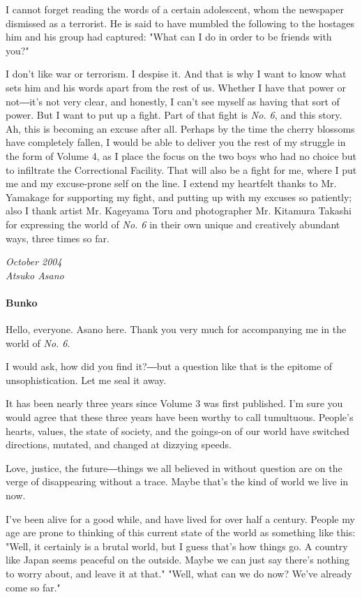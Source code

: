 I cannot forget reading the words of a certain adolescent, whom the
newspaper dismissed as a terrorist. He is said to have mumbled the
following to the hostages him and his group had captured: "What can I do
in order to be friends with you?"

I don't like war or terrorism. I despise it. And that is why I want to
know what sets him and his words apart from the rest of us. Whether I
have that power or not―it's not very clear, and honestly, I can't see
myself as having that sort of power. But I want to put up a fight. Part
of that fight is \emph{No. 6}, and this story. Ah, this is becoming an excuse
after all. Perhaps by the time the cherry blossoms have completely
fallen, I would be able to deliver you the rest of my struggle in the
form of Volume 4, as I place the focus on the two boys who had no choice
but to infiltrate the Correctional Facility. That will also be a fight
for me, where I put me and my excuse-prone self on the line. I extend my
heartfelt thanks to Mr. Yamakage for supporting my fight, and putting up
with my excuses so patiently; also I thank artist Mr. Kageyama Toru and
photographer Mr. Kitamura Takashi for expressing the world of \emph{No. 6} in
their own unique and creatively abundant ways, three times so far.

\myspace

\emph{October 2004\\
	Atsuko Asano}

\paragraph{Bunko}

Hello, everyone. Asano here. Thank you very much for accompanying me in
the world of \emph{No. 6}.

I would ask, how did you find it?―but a question like that is the
epitome of unsophistication. Let me seal it away.

It has been nearly three years since Volume 3 was first published. I'm
sure you would agree that these three years have been worthy to call
tumultuous. People's hearts, values, the state of society, and the
goings-on of our world have switched directions, mutated, and changed at
dizzying speeds.

Love, justice, the future―things we all believed in without question are
on the verge of disappearing without a trace. Maybe that's the kind of
world we live in now.

I've been alive for a good while, and have lived for over half a
century. People my age are prone to thinking of this current state of
the world as something like this: "Well, it certainly is a brutal world,
but I guess that's how things go. A country like Japan seems peaceful on
the outside. Maybe we can just say there's nothing to worry about, and
leave it at that." "Well, what can we do now? We've already come so
far."

